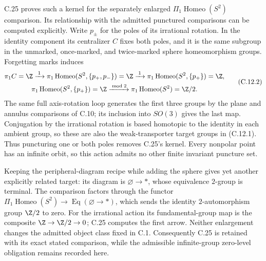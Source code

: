 C.25 proves such a kernel for the separately enlarged
$\Pi_1\operatorname{Homeo}(S^2)$ comparison. Its relationship with the
admitted punctured comparisons can be computed explicitly. Write
$p_\pm$ for the poles of its irrational rotation. In the identity
component its centralizer $C$ fixes both poles, and it is the same
subgroup in the unmarked, once-marked, and twice-marked sphere
homeomorphism groups. Forgetting marks induces
\[
\begin{gathered}
 \pi_1C=\Z
 \xrightarrow{\;1\;}\pi_1\operatorname{Homeo}(S^2,\{p_+,p_-\})=\Z
 \xrightarrow{\;1\;}\pi_1\operatorname{Homeo}(S^2,\{p_+\})=\Z,\\
 \pi_1\operatorname{Homeo}(S^2,\{p_+\})=\Z
 \xrightarrow{\bmod 2}\pi_1\operatorname{Homeo}(S^2)=\Z/2.
\end{gathered}                                           \tag{C.12.2}
\]
The same full axis-rotation loop generates the first three groups by
the plane and annulus comparisons of C.10; its inclusion into $SO(3)$
gives the last map. Conjugation by the irrational rotation is based
homotopic to the identity in each ambient group, so these are also the
weak-transporter target groups in (C.12.1). Thus puncturing one or both
poles removes C.25's kernel. Every nonpolar point has an infinite orbit,
so this action admits no other finite invariant puncture set.

Keeping the peripheral-diagram recipe while adding the sphere gives
yet another explicitly related target: its diagram is
$\varnothing\to *$, whose equivalence $2$-group is terminal. The
comparison factors through the functor
$\Pi_1\operatorname{Homeo}(S^2)\to\operatorname{Eq}(\varnothing\to*)$,
which sends the identity $2$-automorphism group $\Z/2$ to zero. For the
irrational action its fundamental-group map is the composite
$\Z\to\Z/2\to0$; C.25 computes the first arrow. Neither enlargement
changes the admitted object class fixed in C.1. Consequently C.25 is
retained with its exact stated comparison, while the admissible
infinite-group zero-level obligation remains recorded here.

